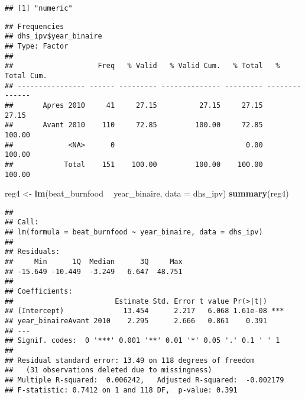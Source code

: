 \documentclass[
]{article}
\newenvironment{Shaded}{\begin{snugshade}}{\end{snugshade}}
\newcommand{\DataTypeTok}[1]{\textcolor[rgb]{0.13,0.29,0.53}{#1}}
\newcommand{\DecValTok}[1]{\textcolor[rgb]{0.00,0.00,0.81}{#1}}
\newcommand{\KeywordTok}[1]{\textcolor[rgb]{0.13,0.29,0.53}{\textbf{#1}}}
\newcommand{\NormalTok}[1]{#1}
\newcommand{\OperatorTok}[1]{\textcolor[rgb]{0.81,0.36,0.00}{\textbf{#1}}}
\newcommand{\StringTok}[1]{\textcolor[rgb]{0.31,0.60,0.02}{#1}}
\begin{document}
\begin{Shaded}
\end{Shaded}

\begin{verbatim}
## [1] "numeric"
\end{verbatim}

\begin{Shaded}
\end{Shaded}

\begin{verbatim}
## Frequencies  
## dhs_ipv$year_binaire  
## Type: Factor  
## 
##                    Freq   % Valid   % Valid Cum.   % Total   % Total Cum.
## ---------------- ------ --------- -------------- --------- --------------
##       Apres 2010     41     27.15          27.15     27.15          27.15
##       Avant 2010    110     72.85         100.00     72.85         100.00
##             <NA>      0                               0.00         100.00
##            Total    151    100.00         100.00    100.00         100.00
\end{verbatim}

\begin{Shaded}
\begin{Highlighting}[]
\NormalTok{reg4 <-}\StringTok{ }\KeywordTok{lm}\NormalTok{(beat_burnfood }\OperatorTok{~}\StringTok{  }\NormalTok{year_binaire, }\DataTypeTok{data =}\NormalTok{ dhs_ipv)}
\KeywordTok{summary}\NormalTok{(reg4)}
\end{Highlighting}
\end{Shaded}

\begin{verbatim}
## 
## Call:
## lm(formula = beat_burnfood ~ year_binaire, data = dhs_ipv)
## 
## Residuals:
##     Min      1Q  Median      3Q     Max 
## -15.649 -10.449  -3.249   6.647  48.751 
## 
## Coefficients:
##                        Estimate Std. Error t value Pr(>|t|)    
## (Intercept)              13.454      2.217   6.068 1.61e-08 ***
## year_binaireAvant 2010    2.295      2.666   0.861    0.391    
## ---
## Signif. codes:  0 '***' 0.001 '**' 0.01 '*' 0.05 '.' 0.1 ' ' 1
## 
## Residual standard error: 13.49 on 118 degrees of freedom
##   (31 observations deleted due to missingness)
## Multiple R-squared:  0.006242,   Adjusted R-squared:  -0.002179 
## F-statistic: 0.7412 on 1 and 118 DF,  p-value: 0.391
\end{verbatim}
\end{document}
